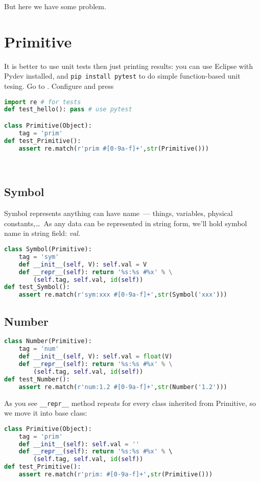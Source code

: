 But here we have some problem.

\section{Primitive}

It is better to use unit tests then just printing results: you can use Eclipse
with Pydev installed, and \verb|pip install pytest| to do simple function-based
unit tesing. Go to
. Configure  and press

\bigskip
\begin{lstlisting}[language=Python]
import re # for tests
def test_hello(): pass # use pytest

class Primitive(Object):
    tag = 'prim'
def test_Primitive():
    assert re.match(r'prim #[0-9a-f]+',str(Primitive()))
\end{lstlisting}

\ \\

\subsection{Symbol}

Symbol represents anything can have name\ --- things, variables,
physical constants,\ldots\ As any data can be represented in string form, we'll
hold symbol name in string field: \emph{val}.


\begin{lstlisting}[language=Python]
class Symbol(Primitive):
    tag = 'sym'
    def __init__(self, V): self.val = V
    def __repr__(self): return '%s:%s #%x' % \
    	(self.tag, self.val, id(self))
def test_Symbol():
    assert re.match(r'sym:xxx #[0-9a-f]+',str(Symbol('xxx')))
\end{lstlisting}

\subsection{Number}


\begin{lstlisting}[language=Python]
class Number(Primitive):
    tag = 'num'
    def __init__(self, V): self.val = float(V)
    def __repr__(self): return '%s:%s #%x' % \
    	(self.tag, self.val, id(self))
def test_Number():
    assert re.match(r'num:1.2 #[0-9a-f]+',str(Number('1.2')))
\end{lstlisting}
As you see \verb|__repr__| method repeats for every class inherited from
Primitive, so we move it into base class:

\begin{lstlisting}[language=Python]
class Primitive(Object):
    tag = 'prim'
    def __init__(self): self.val = ''
    def __repr__(self): return '%s:%s #%x' % \ 
    	(self.tag, self.val, id(self))
def test_Primitive():
    assert re.match(r'prim: #[0-9a-f]+',str(Primitive()))
\end{lstlisting}
 
